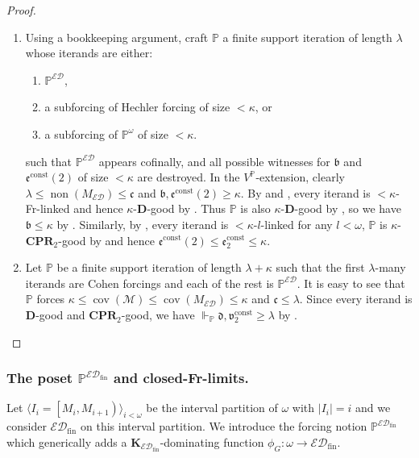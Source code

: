 \documentclass[a4paper,12pt]{amsart}
\theoremstyle{definition}
\numberwithin{thm}{section}
\numberwithin{equation}{section}
\newcommand{\p}{\mathbb{P}}
\newcommand{\bb}{\mathfrak{b}}
\newcommand{\cc}{\mathfrak{c}}
\newcommand{\dd}{\mathfrak{d}}
\newcommand{\ee}{\mathfrak{e}}
\DeclareMathOperator{\non}{non}
\DeclareMathOperator{\cov}{cov}
\newcommand{\covm}{\cov(\mathcal{M})}
\newcommand{\ed}{\mathcal{ED}}
\newcommand{\edfin}{\mathcal{ED}_\mathrm{fin}}
\newcommand{\posetEDfin}{\mathbb{P}^{\edfin}}
\newcommand{\posetED}{\mathbb{P}^{\ed}}
\newcommand{\eec}{\ee^{\mathrm{const}}}
\newcommand{\vv}{\mathfrak{v}}
\newcommand{\vvc}{\vv^{\mathrm{const}}}
\begin{document}
    \begin{proof}
        \begin{enumerate}
            \item Using a bookkeeping argument, craft $\p$ a finite support iteration of length $\lambda$ whose iterands are either:
            \begin{enumerate}
                \item $\posetED$,
                \item a subforcing of Hechler forcing of size $<\kappa$, or
                \item a subforcing of $\p^\omega$ of size $<\kappa$.
            \end{enumerate}
            such that $\posetED$ appears cofinally, and all possible witnesses for $\bb$ and $\eec(2)$ of size $< \kappa$ are destroyed.
            In the $V^\p$-extension, clearly $\lambda\leq\non(M_{\ed})\leq\cc$ and $\bb,\eec(2)\geq\kappa$. By  and , every iterand is $<\kappa$-Fr-linked and hence $\kappa$-$\mathbf{D}$-good by .
            Thus $\p$ is also $\kappa$-$\mathbf{D}$-good by , so we have $\bb\leq\kappa$ by . Similarly, by , every iterand is $<\kappa$-$l$-linked for any $l<\omega$, $\p$ is $\kappa$-$\mathbf{CPR}_2$-good by  and hence $\eec(2)\leq\eec_2\leq\kappa$.
            \item Let $\p$ be a finite support iteration of length $\lambda+\kappa$ such that the first $\lambda$-many iterands are Cohen forcings and each of the rest is $\posetED$. It is easy to see that $\p$ forces $\kappa\leq\covm\leq\cov(M_{\ed})\leq\kappa$ and $\cc\leq\lambda$. 
            Since every iterand is $\mathbf{D}$-good and $\mathbf{CPR}_2$-good, we have $\Vdash_{\p}\dd,\vvc_2\geq\lambda$ by .
        \end{enumerate}
    \end{proof}


    \subsubsection{The poset $\posetEDfin$ and closed-Fr-limits.}\label{sec:posetEDfin}

    Let $\langle I_i=\left[M_i,M_{i+1}\right)\rangle_{i<\omega}$ be the interval partition of $\omega$ with $|I_i|=i$ and we consider $\edfin$ on this interval partition. We introduce the forcing notion $\posetEDfin$ which generically adds a $\mathbf{K}_{\edfin}$-dominating function $\phi_G\colon\omega\to\edfin$.
	
\end{document}
